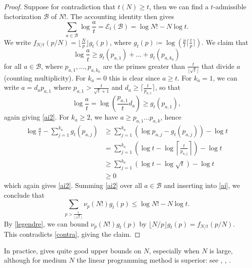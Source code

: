 \documentclass[12pt,a4paper,reqno]{amsart}
\numberwithin{equation}{section}
\theoremstyle{plain}
\theoremstyle{definition}
\newcommand\tuple{{\mathcal B}}
\newcommand\excess{{\mathcal{E}}}
\begin{document}
  \begin{proof} Suppose for contradiction that $t(N) \geq t$, then we can find a $t$-admissible factorization $\tuple$ of $N!$.  The accounting identity then gives
  \begin{equation}\label{ai}
  \sum_{a \in \tuple} \log \frac{a}{t} = \excess_t(\tuple) = \log N! - N \log t.
  \end{equation}
  We write $f_{N/t}(p/N) = \lfloor \frac{N}{p} \rfloor g_t(p)$, where $g_t(p) \coloneqq \log (\frac{p}{t} \lceil \frac{t}{p} \rceil)$.  We claim that 
    \begin{equation}\label{ai2}
      \log \frac{a}{t} \geq g_t(p_{a,1}) + \dots + g_t(p_{a,k_a})
    \end{equation}
for all $a \in \tuple$, where $p_{a,1},\dots,p_{a,k_a}$ are the primes greater than $\frac{t}{\lfloor \sqrt{t}\rfloor}$ that divide $a$ (counting multiplicity).  For $k_a=0$ this is clear since $a \geq t$.  For $k_a=1$, we can write $a = d_a p_{a,1}$ where $p_{a,1} > \frac{t}{\sqrt{t}+1}$ and $d_a \geq \lceil \frac{t}{p_{a,1}} \rceil$, so that
    $$ \log \frac{a}{t} = \log \left(\frac{p_{a,1}}{t}d_a \right) \geq g_t(p_{a,1}),$$
    again giving \eqref{ai2}.  For $k_a \geq 2$, we have $a \geq p_{a,1} \dots p_{a,k}$, hence
    \begin{align*}
      \log \frac{a}{t} - \sum_{j=1}^{k_a} g_t(p_{a,j}) &\geq \sum_{j=1}^{k_a} (\log p_{a,j} - g_t(p_{a,j})) - \log t \\
      &= \sum_{j=1}^{k_a} \left(\log t - \log \left \lceil \frac{t}{p_{a,j}} \right\rceil \right) - \log t \\
      &\geq \sum_{j=1}^{k_a} \left(\log t - \log \sqrt{t} \right) - \log t \\
      &\geq 0
    \end{align*}
    which again gives \eqref{ai2}.  Summing \eqref{ai2} over all $a \in \tuple$ and inserting into \eqref{ai}, we conclude that
    $$ \sum_{p > \frac{t}{\lfloor\sqrt{t}\rfloor}} \nu_p(N!) g_t(p) \leq \log N! - N \log t.$$    
    By \eqref{legendre}, we can bound $\nu_p(N!) g_t(p)$ by $\lfloor N/p \rfloor g_t(p) = f_{N/t}(p/N)$.  This contradicts \eqref{contra}, giving the claim. 
  \end{proof}

In practice,  gives quite good upper bounds on $N$, especially when $N$ is large, although for medium $N$ the linear programming method is superior: see , , .
    
\end{document}
